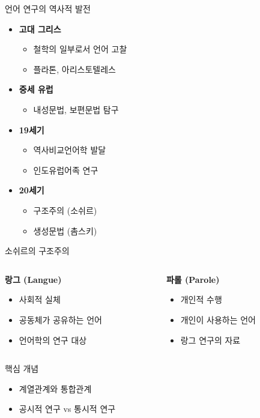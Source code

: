 \documentclass[aspectratio=169]{beamer}
\begin{document}
\begin{frame}{언어 연구의 역사적 발전}
\begin{itemize}
\item \textbf{고대 그리스}
    \begin{itemize}
    \item 철학의 일부로서 언어 고찰
    \item 플라톤, 아리스토텔레스
    \end{itemize}
\item \textbf{중세 유럽}
    \begin{itemize}
    \item 내성문법, 보편문법 탐구
    \end{itemize}
\item \textbf{19세기}
    \begin{itemize}
    \item 역사비교언어학 발달
    \item 인도유럽어족 연구
    \end{itemize}
\item \textbf{20세기}
    \begin{itemize}
    \item 구조주의 (소쉬르)
    \item 생성문법 (촘스키)
    \end{itemize}
\end{itemize}
\end{frame}

\begin{frame}{소쉬르의 구조주의}
\begin{columns}
\begin{column}{0.5\textwidth}
\textbf{랑그 (Langue)}
\begin{itemize}
\item 사회적 실체
\item 공동체가 공유하는 언어
\item 언어학의 연구 대상
\end{itemize}
\end{column}
\begin{column}{0.5\textwidth}
\textbf{파롤 (Parole)}
\begin{itemize}
\item 개인적 수행
\item 개인이 사용하는 언어
\item 랑그 연구의 자료
\end{itemize}
\end{column}
\end{columns}

\vspace{0.5cm}
\begin{block}{핵심 개념}
\begin{itemize}
\item 계열관계와 통합관계
\item 공시적 연구 vs 통시적 연구
\end{itemize}
\end{block}
\end{frame}
\end{document}
